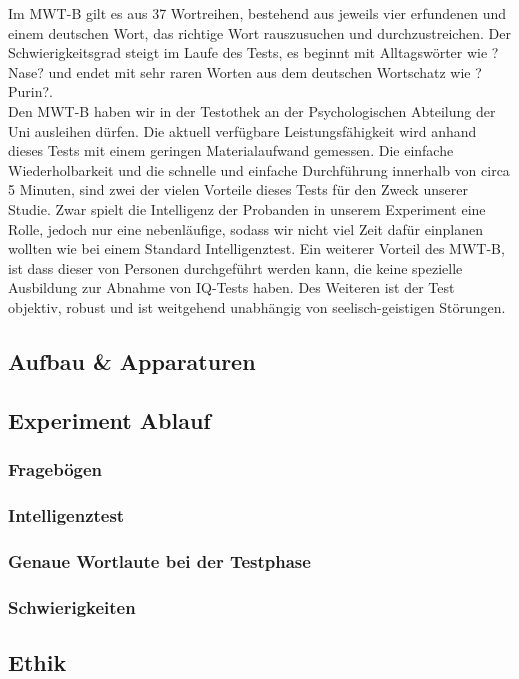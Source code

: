 \documentclass{Bericht}
\begin{document}
Im MWT-B gilt es aus 37 Wortreihen, bestehend aus jeweils vier erfundenen und einem deutschen Wort, das richtige Wort rauszusuchen und durchzustreichen. Der Schwierigkeitsgrad steigt im Laufe des Tests, es beginnt mit Alltagswörter wie ?Nase? und endet mit sehr raren Worten aus dem deutschen Wortschatz wie ?Purin?. \\

Den MWT-B haben wir in der Testothek an der Psychologischen Abteilung der Uni ausleihen dürfen. Die aktuell verfügbare Leistungsfähigkeit wird anhand dieses Tests mit einem geringen Materialaufwand gemessen. Die einfache Wiederholbarkeit und die schnelle und einfache Durchführung innerhalb von circa 5 Minuten, sind zwei der vielen Vorteile dieses Tests für den Zweck unserer Studie. Zwar spielt die Intelligenz der Probanden in unserem Experiment eine Rolle, jedoch nur eine nebenläufige, sodass wir nicht viel Zeit dafür einplanen wollten wie bei einem Standard Intelligenztest. Ein weiterer Vorteil des MWT-B, ist dass dieser von Personen durchgeführt werden kann, die keine spezielle Ausbildung zur Abnahme von IQ-Tests haben. Des Weiteren ist der Test objektiv, robust und ist weitgehend unabhängig von seelisch-geistigen Störungen. \\

	\subsection{Aufbau \& Apparaturen}
	\subsection{Experiment Ablauf}
		\subsubsection{Fragebögen}
		\subsubsection{Intelligenztest}
		\subsubsection{Genaue Wortlaute bei der Testphase}
		\subsubsection{Schwierigkeiten}
	\subsection{Ethik}
\end{document}
